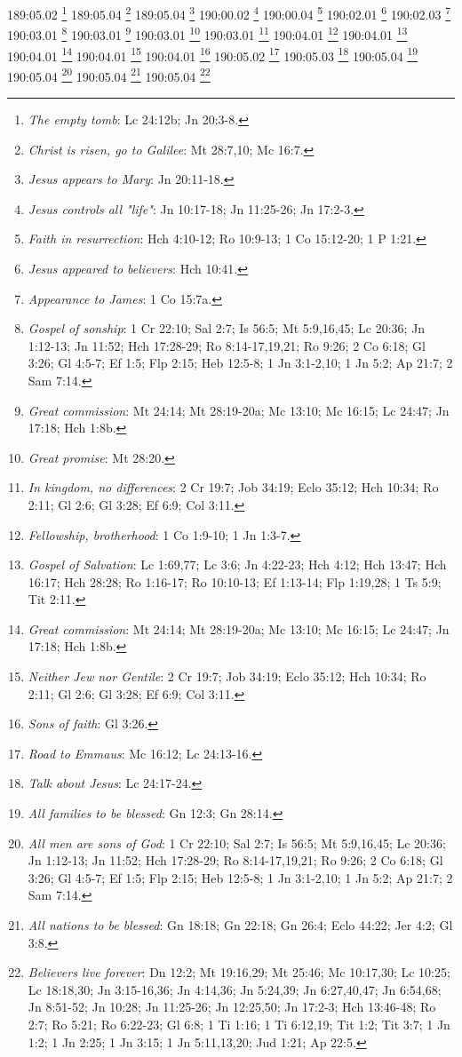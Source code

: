 189:05.02 \footnote{\textit{The empty tomb}: Lc 24:12b; Jn 20:3-8.}
189:05.04 \footnote{\textit{Christ is risen, go to Galilee}: Mt 28:7,10; Mc 16:7.}
189:05.04 \footnote{\textit{Jesus appears to Mary}: Jn 20:11-18.}
190:00.02 \footnote{\textit{Jesus controls all "life"}: Jn 10:17-18; Jn 11:25-26; Jn 17:2-3.}
190:00.04 \footnote{\textit{Faith in resurrection}: Hch 4:10-12; Ro 10:9-13; 1 Co 15:12-20; 1 P 1:21.}
190:02.01 \footnote{\textit{Jesus appeared to believers}: Hch 10:41.}
190:02.03 \footnote{\textit{Appearance to James}: 1 Co 15:7a.}
190:03.01 \footnote{\textit{Gospel of sonship}: 1 Cr 22:10; Sal 2:7; Is 56:5; Mt 5:9,16,45; Lc 20:36; Jn 1:12-13; Jn 11:52; Hch 17:28-29; Ro 8:14-17,19,21; Ro 9:26; 2 Co 6:18; Gl 3:26; Gl 4:5-7; Ef 1:5; Flp 2:15; Heb 12:5-8; 1 Jn 3:1-2,10; 1 Jn 5:2; Ap 21:7; 2 Sam 7:14.}
190:03.01 \footnote{\textit{Great commission}: Mt 24:14; Mt 28:19-20a; Mc 13:10; Mc 16:15; Lc 24:47; Jn 17:18; Hch 1:8b.}
190:03.01 \footnote{\textit{Great promise}: Mt 28:20.}
190:03.01 \footnote{\textit{In kingdom, no differences}: 2 Cr 19:7; Job 34:19; Eclo 35:12; Hch 10:34; Ro 2:11; Gl 2:6; Gl 3:28; Ef 6:9; Col 3:11.}
190:04.01 \footnote{\textit{Fellowship, brotherhood}: 1 Co 1:9-10; 1 Jn 1:3-7.}
190:04.01 \footnote{\textit{Gospel of Salvation}: Lc 1:69,77; Lc 3:6; Jn 4:22-23; Hch 4:12; Hch 13:47; Hch 16:17; Hch 28:28; Ro 1:16-17; Ro 10:10-13; Ef 1:13-14; Flp 1:19,28; 1 Ts 5:9; Tit 2:11.}
190:04.01 \footnote{\textit{Great commission}: Mt 24:14; Mt 28:19-20a; Mc 13:10; Mc 16:15; Lc 24:47; Jn 17:18; Hch 1:8b.}
190:04.01 \footnote{\textit{Neither Jew nor Gentile}: 2 Cr 19:7; Job 34:19; Eclo 35:12; Hch 10:34; Ro 2:11; Gl 2:6; Gl 3:28; Ef 6:9; Col 3:11.}
190:04.01 \footnote{\textit{Sons of faith}: Gl 3:26.}
190:05.02 \footnote{\textit{Road to Emmaus}: Mc 16:12; Lc 24:13-16.}
190:05.03 \footnote{\textit{Talk about Jesus}: Lc 24:17-24.}
190:05.04 \footnote{\textit{All families to be blessed}: Gn 12:3; Gn 28:14.}
190:05.04 \footnote{\textit{All men are sons of God}: 1 Cr 22:10; Sal 2:7; Is 56:5; Mt 5:9,16,45; Lc 20:36; Jn 1:12-13; Jn 11:52; Hch 17:28-29; Ro 8:14-17,19,21; Ro 9:26; 2 Co 6:18; Gl 3:26; Gl 4:5-7; Ef 1:5; Flp 2:15; Heb 12:5-8; 1 Jn 3:1-2,10; 1 Jn 5:2; Ap 21:7; 2 Sam 7:14.}
190:05.04 \footnote{\textit{All nations to be blessed}: Gn 18:18; Gn 22:18; Gn 26:4; Eclo 44:22; Jer 4:2; Gl 3:8.}
190:05.04 \footnote{\textit{Believers live forever}: Dn 12:2; Mt 19:16,29; Mt 25:46; Mc 10:17,30; Lc 10:25; Lc 18:18,30; Jn 3:15-16,36; Jn 4:14,36; Jn 5:24,39; Jn 6:27,40,47; Jn 6:54,68; Jn 8:51-52; Jn 10:28; Jn 11:25-26; Jn 12:25,50; Jn 17:2-3; Hch 13:46-48; Ro 2:7; Ro 5:21; Ro 6:22-23; Gl 6:8; 1 Ti 1:16; 1 Ti 6:12,19; Tit 1:2; Tit 3:7; 1 Jn 1:2; 1 Jn 2:25; 1 Jn 3:15; 1 Jn 5:11,13,20; Jud 1:21; Ap 22:5.}
